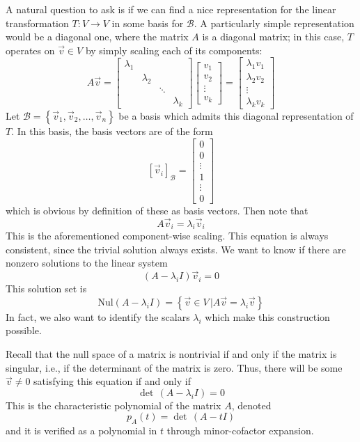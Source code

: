 A natural question to ask is if we can find a nice representation for the linear transformation $T:V\rightarrow V$ in some basis for $\mathcal{B}$. A particularly simple representation would be a diagonal one, where the matrix $A$ is a diagonal matrix; in this case, $T$ operates on $\vec{v}\in V$ by simply scaling each of its components: \[ A\vec{v} = \left[ \begin{array}{cccc} \lambda_1 & & & \\
& \lambda_2 & & \\
& & \ddots & \\
& & & \lambda_k \end{array}\right]\left[ \begin{array}{c} v_1 \\ v_2 \\ \vdots \\ v_k \end{array} \right] = \left[ \begin{array}{c} \lambda_1 v_1 \\ \lambda_2 v_2 \\ \vdots \\ \lambda_k v_k \end{array} \right] \]
Let $\mathcal{B} = \left\{\vec{v}_1, \vec{v}_2,\ldots, \vec{v}_n\right\} $ be a basis which admits this diagonal representation of $T$. In this basis, the basis vectors are of the form \[ \left[\vec{v}_i\right]_{\mathcal{B}} = \left[  \begin{array}{c} 0 \\ 0 \\ \vdots \\ 1 \\ \vdots \\ 0 \end{array}\right] \] which is obvious by definition of these as basis vectors. Then note that \[ A\vec{v}_i = \lambda_i \vec{v}_i \] This is the aforementioned component-wise scaling. This equation is always consistent, since the trivial solution always exists. We want to know if there are nonzero solutions to the linear system \[ \left(A-\lambda_i I \right)\vec{v}_i = 0 \] This solution set is \[ \text{Nul}\left(A-\lambda_i I\right) = \left\{ \vec{v} \in V \, | A\vec{v} = \lambda_i \vec{v} \right\} \] In fact, we also want to identify the scalars $\lambda_i$ which make this construction possible.

Recall that the null space of a matrix is nontrivial if and only if the matrix is singular, i.e., if the determinant of the matrix is zero. Thus, there will be some $\vec{v}\neq 0$ satisfying this equation if and only if \[ \det \, \left(A-\lambda_i I\right) = 0 \] This is the characteristic polynomial of the matrix $A$, denoted \[ p_A\left(t\right) = \det\, \left(A-t I\right) \] and it is verified as a polynomial in $t$ through minor-cofactor expansion.

